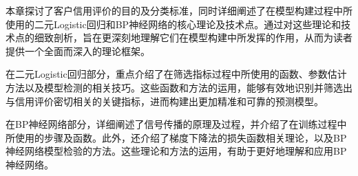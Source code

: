 本章探讨了客户信用评价的目的及分类标准，同时详细阐述了在模型构建过程中所使用的二元Logistic回归和BP神经网络的核心理论及技术点。通过对这些理论和技术点的细致剖析，旨在更深刻地理解它们在模型构建中所发挥的作用，从而为读者提供一个全面而深入的理论框架。

在二元Logistic回归部分，重点介绍了在筛选指标过程中所使用的函数、参数估计方法以及模型检测的相关技巧。这些函数和方法的运用，能够有效地识别并筛选出与信用评价密切相关的关键指标，进而构建出更加精准和可靠的预测模型。

在BP神经网络部分，详细阐述了信号传播的原理及过程，并介绍了在训练过程中所使用的步骤及函数。此外，还介绍了梯度下降法的损失函数相关理论，以及BP神经网络模型检验的方法。这些理论和方法的运用，有助于更好地理解和应用BP神经网络。